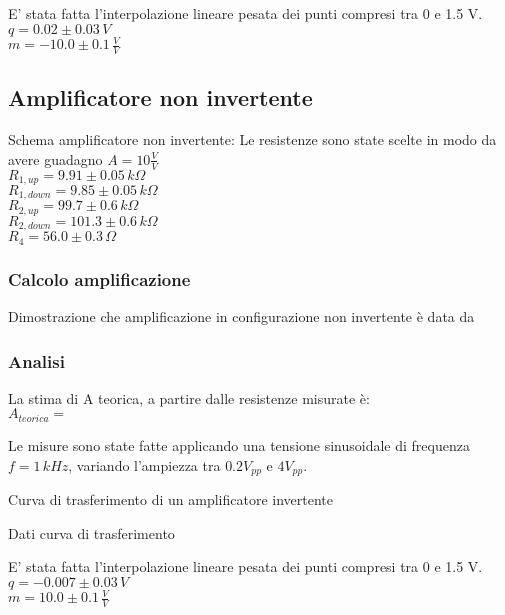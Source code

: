 E' stata fatta l'interpolazione lineare pesata dei punti compresi tra 0 e 1.5 V.\\
$q = 0.02 \pm 0.03 \,V$\\
$m = -10.0 \pm 0.1 \, \frac{V}{V}$




\subsection{Amplificatore non invertente}

Schema amplificatore non invertente:
Le resistenze sono state scelte in modo da avere guadagno $A=10 \frac{V}{V}$\\
$R_{1,up}=9.91 \pm0.05 \,k\Omega $\\ %
$R_{1,down}=9.85 \pm 0.05\,k\Omega$\\ %
$R_{2,up}=99.7 \pm 0.6\,k\Omega$\\ %
$R_{2,down}=101.3 \pm 0.6\,k\Omega$\\
$R_4=56.0 \pm 0.3\,\Omega$

\subsubsection{Calcolo amplificazione}
Dimostrazione che amplificazione in configurazione non invertente è data da %

\subsubsection{Analisi}
La stima di A teorica, a partire dalle resistenze misurate è:\\
$A_{teorica}=$ %

Le misure sono state fatte applicando una tensione sinusoidale di frequenza $ f=1 \,kHz$, variando l'ampiezza tra 
$0.2 V_{pp}$ e $4 V_{pp}$.

\begin{grafico} 
 \centering 
  
 \caption{Curva di trasferimento di un amplificatore invertente} 
 \label{gr:amp_noninv.tex} 
\end{grafico}

\begin{tabella}
 \centering
  
 \caption{Dati curva di trasferimento}
 \label{tab:tab_non_inv.tex}
\end{tabella}

E' stata fatta l'interpolazione lineare pesata dei punti compresi tra 0 e 1.5 V.\\
$q = -0.007 \pm 0.03 \, V$\\
$m = 10.0 \pm 0.1 \,\frac{V}{V}$

